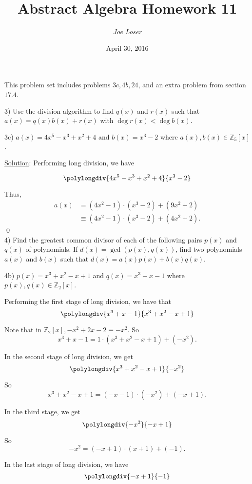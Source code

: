 \documentclass{article}
\title{Abstract Algebra Homework 11}
\author{\textit{Joe Loser}}
\date{April 30, 2016}
\begin{document}
\maketitle

This problem set includes problems $3c, 4b, 24$, and an extra problem from section $17.4$.

3) Use the division algorithm to find $q(x)$ and $r(x)$ such that $a(x) = q(x)b(x) + r(x)$ with $\deg r(x) < \deg b(x)$.

3c) $a(x) = 4x^5-x^3+x^2+4$ and $b(x) = x^3-2$ where $a(x), b(x) \in \mathbb{Z}_5[x]$.

\underline{Solution}: Performing long division, we have

$$\polylongdiv{4x^5-x^3+x^2+4}{x^3-2}$$

Thus,
\begin{align*}
	a(x) &= (4x^2-1) \cdot (x^3-2) + (9x^2+2) \\
	&\equiv (4x^2-1) \cdot (x^3-2) + (4x^2+2).
\end{align*} 
\qed \\

4) Find the greatest common divisor of each of the following pairs $p(x)$ and $q(x)$ of polynomials. If \linebreak $d(x) = \gcd(p(x), q(x))$, find two polynomials $a(x)$ and $b(x)$ such that $d(x) = a(x)p(x) + b(x)q(x)$.

4b) $p(x) = x^3+x^2-x+1$ and $q(x) = x^3+x-1$ where $p(x), q(x) \in \mathbb{Z}_2[x]$.

Performing the first stage of long division, we have that
$$\polylongdiv{x^3+x-1}{x^3+x^2-x+1}$$

Note that in $\mathbb{Z}_2[x], -x^2+2x-2 \equiv -x^2$. So 
\begin{equation}
	x^3 + x -1 = 1 \cdot (x^3+x^2-x+1) + (-x^2).
\end{equation}

In the second stage of long division, we get
$$\polylongdiv{x^3+x^2-x+1}{-x^2}$$

So
\begin{equation}
	x^3+x^2-x+1 = (-x-1) \cdot (-x^2) + (-x+1).
\end{equation}

In the third stage, we get
$$\polylongdiv{-x^2}{-x+1}$$

So
\begin{equation}
	-x^2 = (-x+1) \cdot (x+1) + (-1).
\end{equation}

In the last stage of long division, we have
$$\polylongdiv{-x+1}{-1}$$
\end{document}
